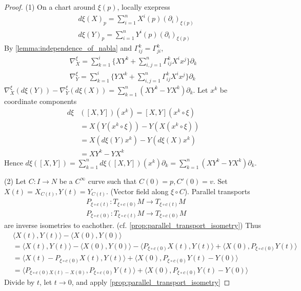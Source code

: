 \begin{proof}
    (1) On a chart around $\xi(p)$, locally exepress
    \[
    \begin{aligned}
        &d \xi(X)_p = \sum_{i=1}^n X^i(p)(\partial_i)_{\xi(p)} \\
        &d \xi(Y)_p = \sum_{i=1}^n Y^i(p)(\partial_i)_{\xi(p)}
    \end{aligned}
    \]
By \autoref{lemma:independence_of_nabla} and $\Gamma_{ij}^k = \Gamma_{ji}^k$,
\[
\begin{aligned}
    \nabla_X^{\xi} = \sum_{k=1}^i \{XY^k+ \sum_{i,j=1}^n \Gamma_{ij}^k X^i x^j\} \partial_k \\
    \nabla_Y^{\xi} = \sum_{k=1}^i \{YX^k+ \sum_{i,j=1}^n \Gamma_{ij}^k X^i x^j\} \partial_k
\end{aligned}
\]
$\nabla_X^{\xi} (d \xi(Y)) - \nabla_Y^{\xi}(d \xi(X)) = \sum_{k=1}^n (XY^k - YX^k) \partial_k$.
Let $x^k$ be coordinate components
\[
\begin{aligned}
    d \xi&([X,Y])(x^k) = [X,Y](x^k \circ \xi) \\
    &= X(Y(x^k \circ \xi)) - Y(X(x^k \circ \xi)) \\
    &= X(d \xi (Y)x^k) - Y(d \xi (X)x^k) \\
    &= XY^k - YX^k
\end{aligned}
\]
Hence $d \xi([X,Y]) = \sum_{k=1}^n d \xi([X,Y])(x^k) \partial_k = \sum_{k=1}^n (XY^k - YX^k) \partial_k$.

(2) Let $C:I \to N$ be a $C^{\infty}$ curve such that $C(0) = p, C'(0) = v$. Set $X(t) = X_{C(t)}, Y(t) = Y_{C(t)}$.
(Vector field along $\xi \circ C$). Parallel transports
\[
\begin{aligned}
    &P_{\xi \circ c(t)} : T_{\xi \circ c(0)}M \to T_{\xi \circ c(t)}M \\
    &P_{\xi \circ c(0)} : T_{\xi \circ c(t)}M \to T_{\xi \circ c(0)}M
\end{aligned}
\]
are inverse isometries to eachother. (cf. \autoref{prop:parallel_transport_isometry})
Thus 
\[
\begin{aligned}
    &\langle X(t), Y(t) \rangle - \langle X(0), Y(0) \rangle \\
    &= \langle X(t), Y(t) \rangle - \langle X(0), Y(0) \rangle - \langle P_{\xi \circ c(0)} X(t), Y(t) \rangle + \langle X(0), P_{\xi \circ c(0)} Y(t) \rangle \\
    &= \langle X(t) - P_{\xi \circ c(0)} X(t), Y(t) \rangle + \langle X(0), P_{\xi \circ c(0)} Y(t) - Y(0) \rangle \\
    &= \langle P_{\xi \circ c(0) X(t) - X(0)}, P_{\xi \circ c(0)} Y(t) \rangle + \langle X(0), P_{\xi \circ c(0)} Y(t) - Y(0) \rangle
\end{aligned}
\]
Divide by $t$, let $t \to 0$, and apply \autoref{prop:parallel_transport_isometry}
\end{proof}